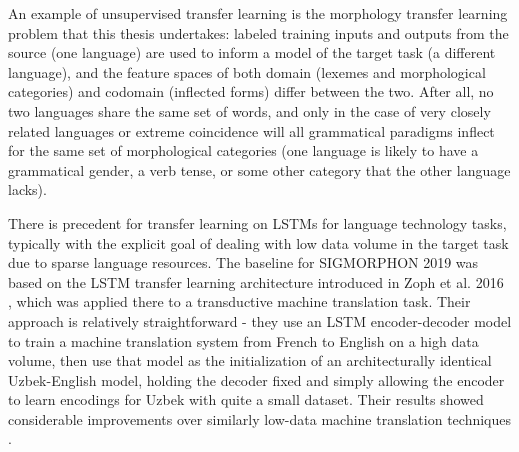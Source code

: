 An example of unsupervised transfer learning is the morphology transfer learning problem that this thesis undertakes: labeled training inputs and outputs from the source (one language) are used to inform a model of the target task (a different language), and the feature spaces of both domain (lexemes and morphological categories) and codomain (inflected forms) differ between the two. After all, no two languages share the same set of words, and only in the case of very closely related languages or extreme coincidence will all grammatical paradigms inflect for the same set of morphological categories (one language is likely to have a grammatical gender, a verb tense, or some other category that the other language lacks).

There is precedent for transfer learning on LSTMs for language technology tasks, typically with the explicit goal of dealing with low data volume in the target task due to sparse language resources. The baseline for SIGMORPHON 2019 was based on the LSTM transfer learning architecture introduced in Zoph et al. 2016 \parencite{McCarthy2019}, which was applied there to a transductive machine translation task. Their approach is relatively straightforward - they use an LSTM encoder-decoder model to train a machine translation system from French to English on a high data volume, then use that model as the initialization of an architecturally identical Uzbek-English model, holding the decoder fixed and simply allowing the encoder to learn encodings for Uzbek with quite a small dataset. Their results showed considerable improvements over similarly low-data machine translation techniques \parencite{Zoph2016}.

